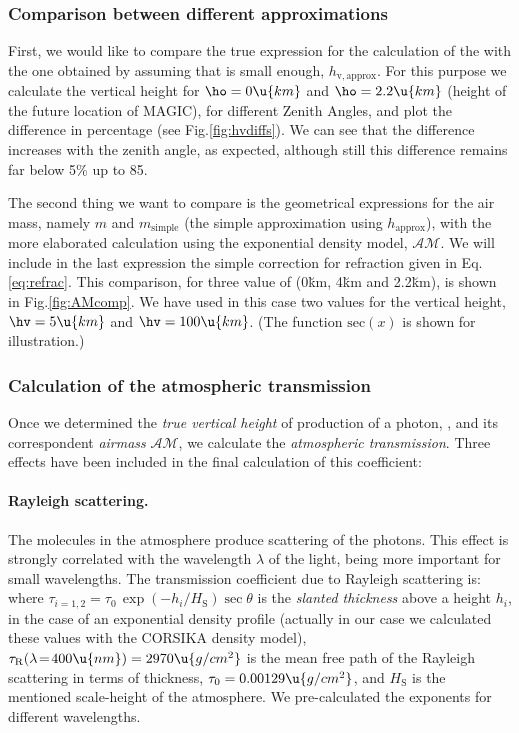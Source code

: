 \subsubsection{Comparison between different approximations}

First, we would like to compare the true expression for the
calculation of the \hv with the one obtained by assuming that \ho is
small enough, $h_{\mathrm{v,approx}}$. For this purpose we calculate
the vertical height for $\ho=0\u{km}$ and $\ho=2.2\u{km}$ (height of
the future location of MAGIC), for different Zenith Angles, and plot
the difference in percentage (see Fig.\ref{fig:hvdiffs}). We can see
that the difference increases with the zenith angle, as expected,
although still this difference remains far below 5\% up to 85\deg.

\hvdiffsfig

The second thing we want to compare is the geometrical expressions for
the air mass, namely $m$ and $m_{\mathrm{simple}}$ (the simple
approximation using $h_{\mathrm{approx}}$), with the more elaborated
calculation using the exponential density model, $\mathcal{AM}$. We
will include in the last expression the simple correction for
refraction given in Eq.\eqref{eq:refrac}. This comparison, for three
value of \ho (0\u{km}, 4\u{km} and 2.2\u{km}), is shown in
Fig.\ref{fig:AMcomp}. We have used in this case two values for the
vertical height, $\hv=5\u{km}$ and $\hv=100\u{km}$. (The function
$\mathrm{sec}(x)$ is shown for illustration.)

\AMcompfig

\subsubsection{Calculation of the atmospheric transmission}

Once we determined the \emph{true vertical height} of production of a
photon, \hv, and its correspondent \emph{airmass} $\mathcal{AM}$, we
calculate the \emph{atmospheric transmission}. Three effects have been
included in the final calculation of this coefficient:

\paragraph{Rayleigh scattering.} The molecules in the atmosphere
produce scattering of the photons. This effect is strongly correlated
with the wavelength $\lambda$ of the light, being more important for
small wavelengths. The transmission coefficient due to Rayleigh
scattering is:
%
\Rayleigheq
%
where $\tau_{i=1,2} = \tau_0 \, \exp(-h_i/H_{\mathrm{S}}) \sec\theta$
is the \emph{slanted thickness} above a height $h_i$, in the case of
an exponential density profile (actually in our case we calculated
these values with the CORSIKA density model),
$\tau_{\mathrm{R}}(\lambda\!=\!400\u{nm}) = 2970\u{g/cm^2}$ is the
mean free path of the Rayleigh scattering in terms of thickness,
$\tau_0 = 0.00129\u{g/cm^2}$, and $H_{\mathrm{S}}$ is the mentioned
scale-height of the atmosphere. We pre-calculated the exponents for
different wavelengths.
  
